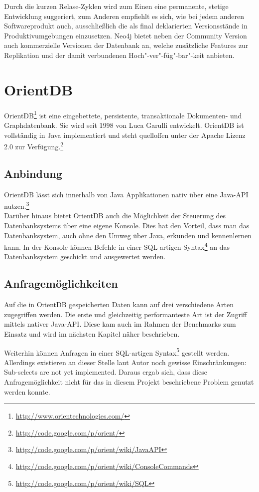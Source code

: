 \documentclass[11pt, a4paper, oneside]{article} %
\begin{document}
Durch die kurzen Relase-Zyklen wird zum Einen eine permanente, stetige Entwicklung suggeriert, zum Anderen empfiehlt es sich, wie bei jedem anderen Softwareprodukt auch, ausschließlich die als final deklarierten Versionsstände in Produktivumgebungen einzusetzen. Neo4j bietet neben der Community Version auch kommerzielle Versionen der Datenbank an, welche zusätzliche Features zur Replikation und der damit verbundenen Hoch"-ver"-füg"-bar"-keit anbieten.

\section{OrientDB}

OrientDB\footnote{\url{http://www.orientechnologies.com/}} ist eine eingebettete, persistente, transaktionale Dokumenten- und Graphdatenbank. Sie wird seit 1998 von Luca Garulli entwickelt. OrientDB ist vollständig in Java implementiert und steht quelloffen unter der Apache Lizenz 2.0 zur Verfügung.\footnote{\url{http://code.google.com/p/orient/}}

\subsection{Anbindung}

OrientDB lässt sich innerhalb von Java Applikationen nativ über eine Java-API nutzen.\footnote{\url{http://code.google.com/p/orient/wiki/JavaAPI}} \\
Darüber hinaus bietet OrientDB auch die Möglichkeit der Steuerung des Datenbanksystems über eine eigene Konsole. Dies hat den Vorteil, dass man das Datenbanksystem, auch ohne den Umweg über Java, erkunden und kennenlernen kann. In der Konsole können Befehle in einer SQL-artigen Syntax\footnote{\url{http://code.google.com/p/orient/wiki/ConsoleCommands}} an das Datenbanksystem geschickt und ausgewertet werden.


\subsection{Anfragemöglichkeiten}

Auf die in OrientDB gespeicherten Daten kann auf drei verschiedene Arten zugegriffen werden. Die erste und gleichzeitig performanteste Art ist der Zugriff mittels nativer Java-API. Diese kam auch im Rahmen der Benchmarks zum Einsatz und wird im nächsten Kapitel näher beschrieben.

Weiterhin können Anfragen in einer SQL-artigen Syntax\footnote{\url{http://code.google.com/p/orient/wiki/SQL}} gestellt werden. Allerdings existieren an dieser Stelle laut Autor noch gewisse Einschränkungen: \glqq{}Sub-selects are not yet implemented.\grqq{} Daraus ergab sich, dass diese Anfragemöglichkeit nicht für das in diesem Projekt beschriebene Problem genutzt werden konnte.
\end{document}
